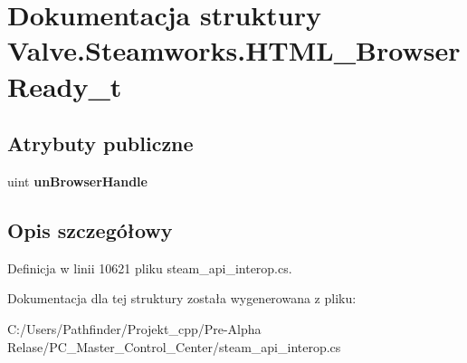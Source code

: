 \hypertarget{struct_valve_1_1_steamworks_1_1_h_t_m_l___browser_ready__t}{}\section{Dokumentacja struktury Valve.\+Steamworks.\+H\+T\+M\+L\+\_\+\+Browser\+Ready\+\_\+t}
\label{struct_valve_1_1_steamworks_1_1_h_t_m_l___browser_ready__t}
\subsection*{Atrybuty publiczne}
\begin{DoxyCompactItemize}
\item 
\mbox{\label{struct_valve_1_1_steamworks_1_1_h_t_m_l___browser_ready__t_a85a7b232f7db70b601e3a14eef1ef787}} 
uint {\bfseries un\+Browser\+Handle}
\end{DoxyCompactItemize}


\subsection{Opis szczegółowy}


Definicja w linii 10621 pliku steam\+\_\+api\+\_\+interop.\+cs.



Dokumentacja dla tej struktury została wygenerowana z pliku\+:\begin{DoxyCompactItemize}
\item 
C\+:/\+Users/\+Pathfinder/\+Projekt\+\_\+cpp/\+Pre-\/\+Alpha Relase/\+P\+C\+\_\+\+Master\+\_\+\+Control\+\_\+\+Center/steam\+\_\+api\+\_\+interop.\+cs\end{DoxyCompactItemize}

